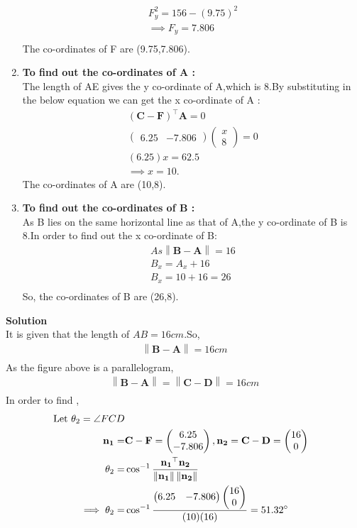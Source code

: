 \documentclass{article}
\providecommand{\norm}[1]{\left\lVert#1\right\rVert}
\newcommand{\myvec}[1]{\ensuremath{\begin{pmatrix}#1\end{pmatrix}}}
\let\vec\mathbf
\begin{document}
\begin{enumerate}
\begin{align}
			F_y^2 = 156 - (9.75)^2\\
			\implies F_y = 7.806\\
		\end{align}
The co-ordinates of F are (9.75,7.806).
\item \textbf{To find out the co-ordinates of A :}\\
	The length of AE gives the y co-ordinate of A,which is 8.By substituting in the below equation we can get the x co-ordinate of A :\\
		\begin{align}
			(\vec{C} - \vec{F})^\top \vec{A} = 0\\
			\myvec{6.25&-7.806}\myvec{x\\8} = 0\\
			(6.25)x = 62.5\\
			\implies x = 10.
		\end{align}
The co-ordinates of A are (10,8).
\item \textbf{To find out the co-ordinates of B :}\\
	As B lies on the same horizontal line as that of A,the y co-ordinate of B is 8.In order to find out the x co-ordinate of B:\\
		\begin{align}
			As \norm{\vec{B} - \vec{A}} = 16\\
			B_x = A_x + 16\\
			B_x = 10 + 16 = 26\\
		\end{align}
		So, the co-ordinates of B are (26,8).
\end{enumerate}
\textbf{Solution}\\
It is given that the length of $AB = 16cm$.So,\\
\begin{align}
	\norm{\vec{B} - \vec{A}} = 16cm \\
\end{align}
As the figure above is a parallelogram,\\
\begin{align}
	\norm{\vec{B} - \vec{A}} = \norm{\vec{C} - \vec{D}} = 16cm
	\label{eq:3}\\
\end{align}
\vspace{5mm}
In order to find ,\\
\begin{align}
	\text{ Let }\theta_2 = \angle{FCD}\\
\vec{n_1} = &\vec{C} - \vec{F} = \myvec{6.25\\-7.806}, \vec{n_2} = \vec{C} - \vec{D} = \myvec{16\\0} \\
\theta_2 = &\cos^{-1}\frac{\vec{n_1}^\top\vec{n_2}}{\norm{\vec{n_1}}\norm{\vec{n_2}}} \\
	\implies\theta_2 = &\cos^{-1}\frac{\myvec{6.25&-7.806}\myvec{16\\0}}{(10)(16)} = 51.32\degree
\end{align}
\end{document}
